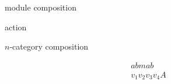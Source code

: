 \documentclass{amsart}
\begin{document}
\thispagestyle{empty}

module composition

action

$n$-category composition


\begin{align*}
abmab & \\
v_1 v_2 v_3 v_4 A
\end{align*}
\end{document}
